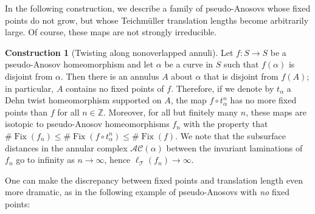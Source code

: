 \documentclass[11pt,letterpaper]{amsart}
\newcommand{\Fix}{\operatorname{Fix}}
\numberwithin{equation}{section}
\theoremstyle{definition}
\newtheorem{construction}[theorem]{Construction}
\newcommand{\T}{\mathcal{T}}
\newcommand{\AC}{\mathcal{AC}}
\begin{document}
In the following construction, we describe a family of pseudo-Anosovs whose fixed points do not grow, but whose Teichm{\"u}ller translation lengths become arbitrarily large. Of course, these maps are not strongly irreducible.  

\begin{construction}[Twisting along nonoverlapped annuli] \label{Const:twist}\label{twist}
Let $f \colon S \to S$ be a pseudo-Anosov homeomorphism and let $\alpha$ be a curve in $S$ such that $f(\alpha)$ is disjoint from $\alpha$. Then there is an annulus $A$ about $\alpha$ 
that is disjoint from $f(A)$; in particular, $A$ contains no fixed points of $f$. Therefore, if we denote by $t_\alpha$ a Dehn twist homeomorphism supported on $A$, the map $f \circ t_\alpha^n$ has no more fixed points than $f$ for all $n \in \mathbb{Z}$. Moreover, for all but finitely many $n$, these maps are isotopic to pseudo-Anosov homeomorphisms $f_n$ with the property that $\# \Fix(f_n) \leq \#\Fix(f \circ t_\alpha^n) \leq \#\Fix(f)$. We note that the subsurface distances in the annular complex  $\AC(\alpha)$ between the invariant laminations of $f_n$ go to infinity as $n \to \infty$, hence $\ell_{\T}(f_n) \to \infty$. 
\end{construction}

One can make the discrepancy between fixed points and translation length even more dramatic, as in the following example of pseudo-Anosovs with \textit{no} fixed points: 
\end{document}

